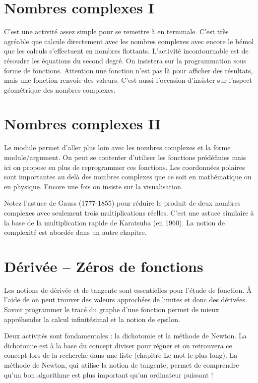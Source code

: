 \documentclass[11pt,class=report,crop=false]{standalone}
\begin{document}
\section{Nombres complexes I}

C'est une activité assez simple pour se remettre à \Python{} en terminale.
C'est très agréable que \Python{} calcule directement avec les nombres complexes avec encore le bémol que les calculs s'effectuent en nombres flottants.
L'activité incontournable est de résoudre les équations du second degré.
On insistera sur la programmation sous forme de fonctions. Attention une fonction n'est pas là pour afficher des résultats, mais une fonction renvoie des valeurs.
C'est aussi l'occasion d'insister sur l'aspect géométrique des nombres complexes.


\section{Nombres complexes II}

Le module  permet d'aller plus loin avec les nombres complexes et la forme module/argument. On peut se contenter d'utiliser les fonctions prédéfinies mais ici on propose en plus de reprogrammer ces fonctions.
Les coordonnées polaires sont importantes au delà des nombres complexes que ce soit en mathématique ou en physique.
Encore une fois on insiste sur la visualisation. 

Notez l'astuce de Gauss (1777-1855) pour réduire le produit de deux nombres complexes avec seulement trois multiplications réelles. C'est une astuce similaire à la base de la multiplication rapide de Karatsuba (en 1960). La notion de complexité est abordée dans un autre chapitre.


\section{Dérivée -- Zéros de fonctions}

Les notions de dérivée et de tangente sont essentielles pour l'étude de fonction.
\`A l'aide de \Python{} on peut trouver des valeurs approchées de limites et donc des dérivées. Savoir programmer le tracé du graphe d'une fonction permet de mieux appréhender la calcul infinitésimal et la notion de \og{}epsilon\fg{}.

Deux activités sont fondamentales : la dichotomie et la méthode de Newton. La dichotomie est à la base du concept \og{}diviser pour régner\fg{} et on retrouvera ce concept lors de la recherche dans une liste (chapitre \og{}Le mot le plus long\fg{}). La méthode de Newton, qui utilise la notion de tangente, permet de comprendre qu'un bon algorithme est plus important qu'un ordinateur puissant !
\end{document}
